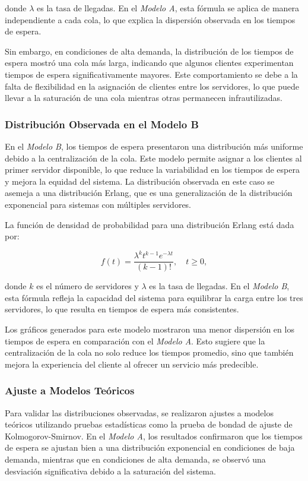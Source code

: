 \documentclass[a4paper,12pt]{article}
\begin{document}
donde \( \lambda \) es la tasa de llegadas. En el \textit{Modelo A}, esta fórmula se aplica de manera independiente a cada cola, lo que explica la dispersión observada en los tiempos de espera.

Sin embargo, en condiciones de alta demanda, la distribución de los tiempos de espera mostró una cola más larga, indicando que algunos clientes experimentan tiempos de espera significativamente mayores. Este comportamiento se debe a la falta de flexibilidad en la asignación de clientes entre los servidores, lo que puede llevar a la saturación de una cola mientras otras permanecen infrautilizadas.

\subsubsection{Distribución Observada en el Modelo B}

En el \textit{Modelo B}, los tiempos de espera presentaron una distribución más uniforme debido a la centralización de la cola. Este modelo permite asignar a los clientes al primer servidor disponible, lo que reduce la variabilidad en los tiempos de espera y mejora la equidad del sistema. La distribución observada en este caso se asemeja a una distribución Erlang, que es una generalización de la distribución exponencial para sistemas con múltiples servidores.

La función de densidad de probabilidad para una distribución Erlang está dada por:

\[
f(t) = \frac{\lambda^k t^{k-1} e^{-\lambda t}}{(k-1)!}, \quad t \geq 0,
\]

donde \( k \) es el número de servidores y \( \lambda \) es la tasa de llegadas. En el \textit{Modelo B}, esta fórmula refleja la capacidad del sistema para equilibrar la carga entre los tres servidores, lo que resulta en tiempos de espera más consistentes.

Los gráficos generados para este modelo mostraron una menor dispersión en los tiempos de espera en comparación con el \textit{Modelo A}. Esto sugiere que la centralización de la cola no solo reduce los tiempos promedio, sino que también mejora la experiencia del cliente al ofrecer un servicio más predecible.

\subsubsection{Ajuste a Modelos Teóricos}

Para validar las distribuciones observadas, se realizaron ajustes a modelos teóricos utilizando pruebas estadísticas como la prueba de bondad de ajuste de Kolmogorov-Smirnov. En el \textit{Modelo A}, los resultados confirmaron que los tiempos de espera se ajustan bien a una distribución exponencial en condiciones de baja demanda, mientras que en condiciones de alta demanda, se observó una desviación significativa debido a la saturación del sistema.
\end{document}
